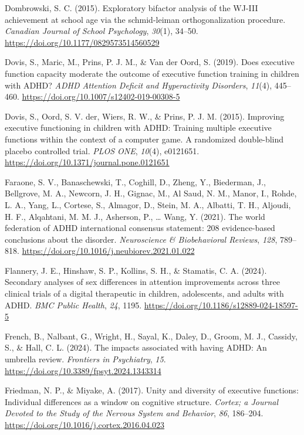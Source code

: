 \documentclass[
  letterpaper,
]{ut-thesis}
\newlength{\cslhangindent}
\newenvironment{CSLReferences}[2] %
 {\begin{list}{}{%
  \setlength{\itemindent}{0pt}
  \setlength{\leftmargin}{0pt}
  \setlength{\parsep}{0pt}
  \ifodd #1
   \setlength{\leftmargin}{\cslhangindent}
   \setlength{\itemindent}{-1\cslhangindent}
  \fi
  \setlength{\itemsep}{#2\baselineskip}}}
 {\end{list}}
\begin{document}
\begin{CSLReferences}{1}{0}
Dombrowski, S. C. (2015). Exploratory bifactor analysis of the {WJ-III}
achievement at school age via the schmid-leiman orthogonalization
procedure. \emph{Canadian Journal of School Psychology}, \emph{30}(1),
34--50. \url{https://doi.org/10.1177/0829573514560529}

Dovis, S., Maric, M., Prins, P. J. M., \& Van der Oord, S. (2019). Does
executive function capacity moderate the outcome of executive function
training in children with {ADHD}? \emph{ADHD Attention Deficit and
Hyperactivity Disorders}, \emph{11}(4), 445--460.
\url{https://doi.org/10.1007/s12402-019-00308-5}

Dovis, S., Oord, S. V. der, Wiers, R. W., \& Prins, P. J. M. (2015).
Improving executive functioning in children with {ADHD}: {Training}
multiple executive functions within the context of a computer game. {A}
randomized double-blind placebo controlled trial. \emph{PLOS ONE},
\emph{10}(4), e0121651.
\url{https://doi.org/10.1371/journal.pone.0121651}

Faraone, S. V., Banaschewski, T., Coghill, D., Zheng, Y., Biederman, J.,
Bellgrove, M. A., Newcorn, J. H., Gignac, M., Al Saud, N. M., Manor, I.,
Rohde, L. A., Yang, L., Cortese, S., Almagor, D., Stein, M. A., Albatti,
T. H., Aljoudi, H. F., Alqahtani, M. M. J., Asherson, P., \ldots{} Wang,
Y. (2021). The world federation of {ADHD} international consensus
statement: 208 evidence-based conclusions about the disorder.
\emph{Neuroscience \& Biobehavioral Reviews}, \emph{128}, 789--818.
\url{https://doi.org/10.1016/j.neubiorev.2021.01.022}

Flannery, J. E., Hinshaw, S. P., Kollins, S. H., \& Stamatis, C. A.
(2024). Secondary analyses of sex differences in attention improvements
across three clinical trials of a digital therapeutic in children,
adolescents, and adults with {ADHD}. \emph{BMC Public Health},
\emph{24}, 1195. \url{https://doi.org/10.1186/s12889-024-18597-5}

French, B., Nalbant, G., Wright, H., Sayal, K., Daley, D., Groom, M. J.,
Cassidy, S., \& Hall, C. L. (2024). The impacts associated with having
{ADHD}: An umbrella review. \emph{Frontiers in Psychiatry}, \emph{15}.
\url{https://doi.org/10.3389/fpsyt.2024.1343314}

Friedman, N. P., \& Miyake, A. (2017). Unity and diversity of executive
functions: {Individual} differences as a window on cognitive structure.
\emph{Cortex; a Journal Devoted to the Study of the Nervous System and
Behavior}, \emph{86}, 186--204.
\url{https://doi.org/10.1016/j.cortex.2016.04.023}


\end{CSLReferences}
\end{document}
